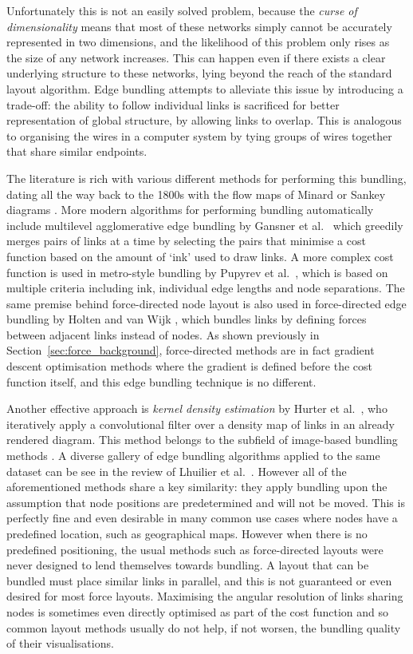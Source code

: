 Unfortunately this is not an easily solved problem, because the \textit{curse of dimensionality} \cite{Friedman2001Local} means that most of these networks simply cannot be accurately represented in two dimensions, and the likelihood of this problem only rises as the size of any network increases. This can happen even if there exists a clear underlying structure to these networks, lying beyond the reach of the standard layout algorithm.
Edge bundling attempts to alleviate this issue by introducing a trade-off: the ability to follow individual links is sacrificed for better representation of global structure, by allowing links to overlap.
This is analogous to organising the wires in a computer system by tying groups of wires together that share similar endpoints.

The literature is rich with various different methods for performing this bundling, dating all the way back to the 1800s with the flow maps of Minard \cite{Minard1862} or Sankey diagrams \cite{Sankey1896}.
More modern algorithms for performing bundling automatically include multilevel agglomerative edge bundling by Gansner et al.\ \cite{Gansner2011} which greedily merges pairs of links at a time by selecting the pairs that minimise a cost function based on the amount of `ink' used to draw links. A more complex cost function is used in metro-style bundling by Pupyrev et al.\ \cite{Pupyrev2016}, which is based on multiple criteria including ink, individual edge lengths and node separations. 
The same premise behind force-directed node layout is also used in force-directed edge bundling by Holten and van Wijk \cite{Holten2009}, which bundles links by defining forces between adjacent links instead of nodes. As shown previously in Section~\ref{sec:force_background}, force-directed methods are in fact gradient descent optimisation methods where the gradient is defined before the cost function itself, and this edge bundling technique is no different.

Another effective approach is \emph{kernel density estimation} by Hurter et al.\ \cite{Hurter2012}, who iteratively apply a convolutional filter over a density map of links in an already rendered diagram. This method belongs to the subfield of image-based bundling methods \cite{Lhuillier2017,Telea2018}. A diverse gallery of edge bundling algorithms applied to the same dataset can be see in the review of Lhuilier et al.\ \cite[Fig.~4]{Lhuillier2017}.
However all of the aforementioned methods share a key similarity: they apply bundling upon the assumption that node positions are predetermined and will not be moved. This is perfectly fine and even desirable in many common use cases where nodes have a predefined location, such as geographical maps. However when there is no predefined positioning, the usual methods such as force-directed layouts were never designed to lend themselves towards bundling. A layout that can be bundled must place similar links in parallel, and this is not guaranteed or even desired for most force layouts. Maximising the angular resolution of links sharing nodes is sometimes even directly optimised as part of the cost function \cite{Argyriou2010} and so common layout methods usually do not help, if not worsen, the bundling quality of their visualisations.

